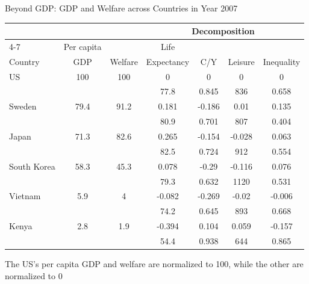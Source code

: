 \documentclass[aspectratio=1610]{beamer}
\begin{document}
\begin{frame}[wide]{Beyond GDP: GDP and Welfare across Countries in Year 2007}
	\begin{table}[htbp]
		\centering
		\begin{tabular}{lcccccc}
			&       &       & \multicolumn{4}{c}{Decomposition} \\
			\cmidrule{4-7}          & Per capita &       & Life  &       &       &  \\
			Country & GDP   & Welfare & Expectancy & C/Y   & Leisure & Inequality \\
			\midrule
			US    & 100   & 100   & 0     & 0     & 0     & 0 \\
			&       &       & 77.8  & 0.845 & 836   & 0.658 \\
			Sweden & 79.4  & 91.2  & 0.181 & -0.186 & 0.01  & 0.135 \\
			&       &       & 80.9  & 0.701 & 807   & 0.404 \\
			Japan & 71.3  & 82.6  & 0.265 & -0.154 & -0.028 & 0.063 \\
			&       &       & 82.5  & 0.724 & 912   & 0.554 \\
			South Korea & 58.3  & 45.3  & 0.078 & -0.29 & -0.116 & 0.076 \\
			&       &       & 79.3  & 0.632 & 1120  & 0.531 \\
			Vietnam & 5.9   & 4     & -0.082 & -0.269 & -0.02 & -0.006 \\
			&       &       & 74.2  & 0.645 & 893   & 0.668 \\
			Kenya & 2.8   & 1.9   & -0.394 & 0.104 & 0.059 & -0.157 \\
			&       &       & 54.4  & 0.938 & 644   & 0.865 \\
			\bottomrule
		\end{tabular}%
	\end{table}%
	The US's per capita GDP and welfare are normalized to 100, while the other are normalized to 0
\end{frame}
\end{document}
